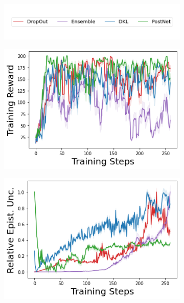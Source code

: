 \begin{figure}
    \centering
        \begin{subfigure}{.5\textwidth}
        \includegraphics[width=\textwidth]{sections/011_icml2022/resources/legend.png}
    \end{subfigure}
    \vspace{-7mm}
    
    \begin{subfigure}{.23\textwidth}
        \includegraphics[width=\textwidth]{sections/011_icml2022/resources/cartpole-training_total_reward-training-model.png}
        \vspace{-5mm}
        \caption{}
         \label{fig:model-training-reward-cartpole}
   \end{subfigure}
    \begin{subfigure}{.23\textwidth}
        \includegraphics[width=\textwidth]{sections/011_icml2022/resources/cartpole-training_epistemic_uncertainty-training-model.png}

\end{subfigure}
\end{figure}
